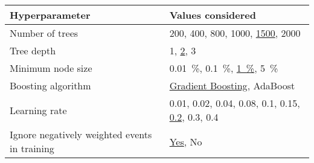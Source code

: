 \begin{tabular}{ll}
  \toprule
  Hyperparameter & Values considered \\
  \midrule
  Number of trees & 200, 400, 800, 1000, \underline{1500}, 2000 \\[0.1em]
  Tree depth & 1, \underline{2}, 3 \\[0.1em]
  Minimum node size & \SI{0.01}{\percent}, \SI{0.1}{\percent}, \underline{\SI{1}{\percent}}, \SI{5}{\percent} \\[0.1em]
  Boosting algorithm & \underline{Gradient Boosting}, AdaBoost~\cite{freund1997decision} \\[0.1em]
  Learning rate & 0.01, 0.02, 0.04, 0.08, 0.1, 0.15, \underline{0.2}, 0.3, 0.4 \\[0.1em]
  Ignore negatively weighted events in training & \underline{Yes}, No \\
  \bottomrule
\end{tabular}

